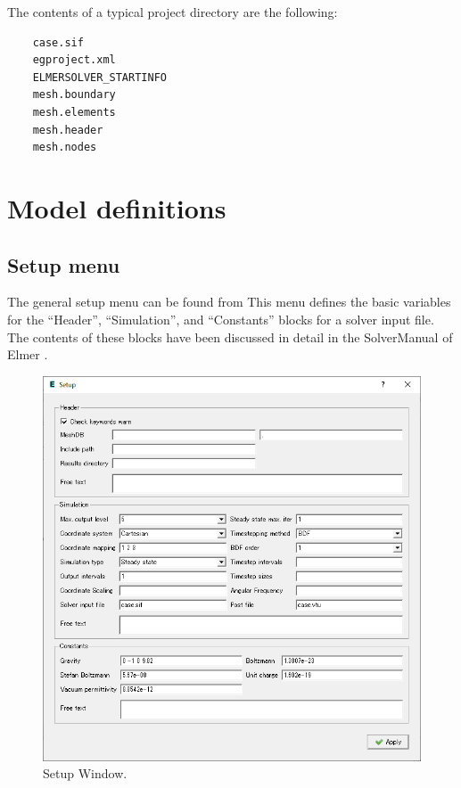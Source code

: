 \vspace{3mm}
The contents of a typical project directory are the following:

\begin{footnotesize}
	\begin{verbatim}
	case.sif 
	egproject.xml
	ELMERSOLVER_STARTINFO 
	mesh.boundary 
	mesh.elements 
	mesh.header 
	mesh.nodes
	\end{verbatim}
\end{footnotesize}

\chapter{Model definitions}

\section{Setup menu}

The general setup menu can be found from
\noindent This menu defines the basic variables for the ``Header'', ``Simulation'',
and ``Constants'' blocks for a solver input file. The contents of these blocks have
been discussed in detail in the SolverManual of Elmer \cite{ElmerHome}.

\begin{figure}[htb]
\begin{center}
 \includegraphics[scale=0.5]{images/setupmenu.png}
\caption{Setup Window.}
\end{center}
\end{figure}

